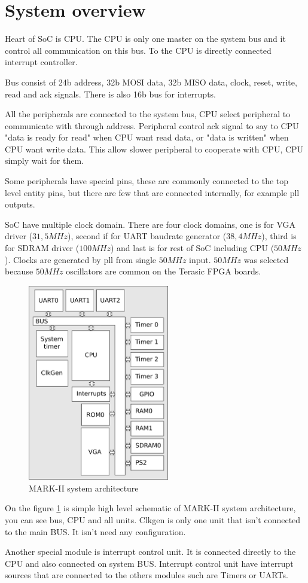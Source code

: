 \section{System overview}

Heart of SoC is CPU. The CPU is only one master on the system bus and it control
all communication on this bus. To the CPU is directly connected interrupt
controller.

Bus consist of 24b address, 32b MOSI data, 32b MISO data, clock, reset, write,
read and ack signals. There is also 16b bus for interrupts.

All the peripherals are connected to the system bus, CPU select peripheral to
communicate with through address. Peripheral control ack signal to say to CPU
"data is ready for read" when CPU want read data, or "data is written" when CPU
want write data. This allow slower peripheral to cooperate with CPU, CPU simply
wait for them.

Some peripherals have special pins, these are commonly connected to the top
level entity pins, but there are few that are connected internally, for example
pll outputs.

SoC have multiple clock domain. There are four clock domains, one is 
for VGA driver ($31,5 MHz$), second if for UART baudrate generator 
($38,4 MHz$), third is for SDRAM driver ($100 MHz$) and last is for 
rest of SoC including CPU ($50 MHz$). Clocks are generated by pll from 
single $50 MHz$ input. $50 MHz$ was selected because $50 MHz$ 
oscillators are common on the Terasic FPGA boards.

\begin{figure}
    \centering
    \includegraphics[width=0.55\textwidth]{img/MARK_II.png}
    \caption{MARK-II system architecture}
    \label{fig:sysarch}
\end{figure}

On the figure \ref{fig:sysarch} is simple high level schematic of MARK-II
system architecture, you can see bus, CPU and all units. Clkgen is only one unit
that isn't connected to the main BUS. It isn't need any configuration.

Another special module is interrupt control unit. It is connected directly to
the CPU and also connected on system BUS. Interrupt control unit have interrupt
sources that are connected to the others modules such are Timers or UARTs.
